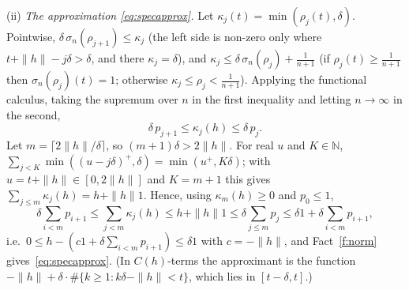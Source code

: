 \documentclass[11pt]{article}
\theoremstyle{remark}
\begin{document}
(ii) \emph{The approximation \eqref{eq:specapprox}.} Let $\kappa_j(t) = \min(\rho_j(t),\delta)$.
Pointwise, $\delta\,\sigma_n(\rho_{j+1})\le\kappa_j$ (the left side is non-zero only where
$t+\|h\|-j\delta>\delta$, and there $\kappa_j = \delta$), and
$\kappa_j\le\delta\,\sigma_n(\rho_j)+\tfrac1{n+1}$ (if $\rho_j(t)\ge\frac1{n+1}$ then
$\sigma_n(\rho_j)(t) = 1$; otherwise $\kappa_j\le\rho_j<\frac1{n+1}$). Applying the
functional calculus, taking the supremum over $n$ in the first inequality and letting
$n\to\infty$ in the second,
\[
 \delta\,p_{j+1}\le\kappa_j(h)\le\delta\,p_j .
\]
Let $m = \lceil 2\|h\|/\delta\rceil$, so $(m+1)\delta>2\|h\|$. For real $u$ and $K\in\mathbb N$,
$\sum_{j<K}\min((u-j\delta)^+,\delta) = \min(u^+,K\delta)$; with $u = t+\|h\|\in[0,2\|h\|]$
and $K = m+1$ this gives $\sum_{j\le m}\kappa_j(h) = h+\|h\|1$. Hence, using
$\kappa_m(h)\ge0$ and $p_0\le1$,
\[
 \delta\sum_{i<m}p_{i+1}\le\sum_{j<m}\kappa_j(h)\le h+\|h\|1\le\delta\sum_{j\le m}p_j
 \le\delta1+\delta\sum_{i<m}p_{i+1},
\]
i.e.\ $0\le h-(c1+\delta\sum_{i<m}p_{i+1})\le\delta1$ with $c = -\|h\|$, and
Fact~\ref{f:norm} gives~\eqref{eq:specapprox}. (In $C(h)$-terms the approximant is the
function $-\|h\|+\delta\cdot\#\{k\ge1 : k\delta-\|h\|<t\}$, which lies in $[t-\delta,t]$.)
\end{document}
